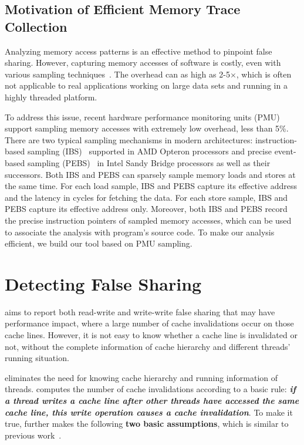 \sloppy
\subsection{Motivation of Efficient Memory Trace Collection}
Analyzing memory access patterns is an effective method to pinpoint false sharing. However, capturing memory accesses of software is costly, even with various sampling techniques~\cite{}. The overhead can as high as 2-5$\times$, which is often not applicable to real applications working on large data sets and running in a highly threaded platform. 

To address this issue, recent hardware performance monitoring units (PMU) support sampling memory accesses with extremely low overhead, less than 5\%. There are two typical sampling mechanisms in modern architectures: instruction-based sampling (IBS)~\cite{} supported in AMD Opteron processors and precise event-based sampling (PEBS)~\cite{} in Intel Sandy Bridge processors as well as their successors. Both IBS and PEBS can sparsely sample memory loads and stores at the same time. For each load sample, IBS and PEBS capture its effective address and the latency in cycles for fetching the data. For each store sample, IBS and PEBS capture its effective address only. Moreover, both IBS and PEBS record the precise instruction pointers of sampled memory accesses, which can be used to associate the analysis with program's source code. To make our analysis efficient, we build our tool based on PMU sampling. 


\section{Detecting False Sharing}
\label{sec:basicidea}
\cheetah{} aims to report both read-write and write-write false sharing that may have performance impact, where a large number of cache invalidations occur on those cache lines. However, it is not easy to know whether a cache line is invalidated or not, without the complete information of cache hierarchy and different threads' running situation. 

\cheetah{} eliminates the need for knowing cache hierarchy and running information of threads. \cheetah{} computes the number of cache invalidations according to a basic rule: {\it \bf if a thread writes a cache line after other threads have accessed the same cache line, this write operation causes a cache invalidation}. To make it true, \cheetah{} further makes the following \textbf{two basic assumptions}, which is similar to previous work~\cite{qinzhao, Predator}.

